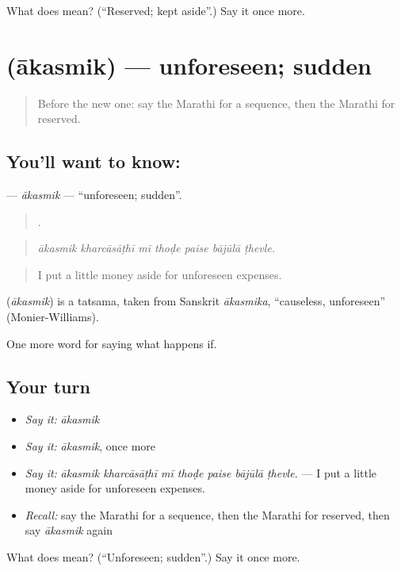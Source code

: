 \begin{tcolorbox}[breakable,colback=teal!4,colframe=teal!35!black,title={Before you move on}]
What does  mean? (\textquotedblleft{}Reserved; kept aside\textquotedblright{}.) Say it once more.
\end{tcolorbox}
\section[\texorpdfstring{\mr{आकस्मिक} (ākasmik)}{आकस्मिक (ākasmik)}]{ (ākasmik) — unforeseen; sudden}

\label{lesson:MR-C551-akasmik}



\begin{quote}
Before the new one: say the Marathi for a sequence, then the Marathi for reserved.
\end{quote}

\subsection*{You'll want to know: }
\textbf{} — \emph{ākasmik} — \textquotedblleft{}unforeseen; sudden\textquotedblright{}.

\begin{quote}
      .
\end{quote}

\begin{quote}
\emph{ākasmik kharcāsāṭhī mī thoḍe paise bājūlā ṭhevle.}
\end{quote}

\begin{quote}
I put a little money aside for unforeseen expenses.
\end{quote}

\begin{cousinweb}
\textbf{} (\emph{ākasmik}) is a tatsama, taken from Sanskrit \emph{ākasmika}, \textquotedblleft{}causeless, unforeseen\textquotedblright{} (Monier-Williams).
\end{cousinweb}

\begin{grammarlens}[title={What you've built}]
One more word for saying what happens if.
\end{grammarlens}

\subsection*{Your turn}
\begin{itemize}
\raggedright
  \item \emph{Say it:} \emph{ākasmik}
  \item \emph{Say it:} \emph{ākasmik}, once more
  \item \emph{Say it:} \emph{ākasmik kharcāsāṭhī mī thoḍe paise bājūlā ṭhevle.} — I put a little money aside for unforeseen expenses.
  \item \emph{Recall:} say the Marathi for a sequence, then the Marathi for reserved, then say \emph{ākasmik} again
\end{itemize}

\begin{tcolorbox}[breakable,colback=teal!4,colframe=teal!35!black,title={Before you move on}]
What does  mean? (\textquotedblleft{}Unforeseen; sudden\textquotedblright{}.) Say it once more.
\end{tcolorbox}
